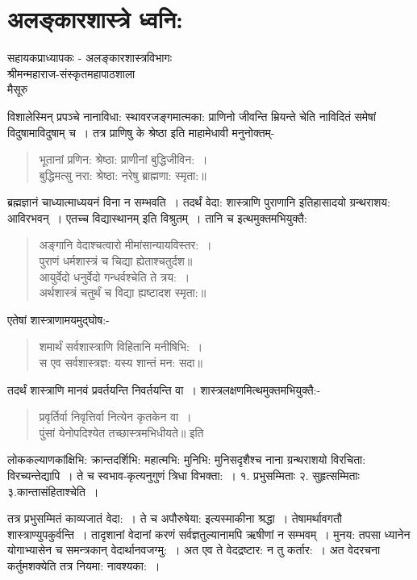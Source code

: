 {\fontsize{15}{17}\selectfont
\presetvalues
\chapter{अलङ्कारशास्त्रे ध्वनि:}

\begin{center}
\smallskip
सहायकप्राध्यापकः - अलङ्कारशास्त्रविभागः\\
श्रीमन्महाराज-संस्कृतमहापाठशाला\\
मैसूरु
\addrule
\end{center}

विशालेस्मिन् प्रपञ्चे नानाविधा: स्थावरजङ्गमात्मका: प्राणिनो जीवन्ति म्रियन्ते चेति नाविदितं समेषां विदुषामाविदुषाम् च~। तत्र प्राणिषु के श्रेष्ठा इति माहामेधावी मनुनोक्तम्-
\begin{verse}
भूतानां प्रणिन: श्रेष्ठा: प्राणीनां बुद्धिजीविन:~। \\
बुद्धिमत्सु नरा: श्रेष्ठा: नरेषु ब्राह्मणा: स्मृता:॥
\end{verse}
ब्रह्मज्ञानं चाध्यात्माध्ययनं विना न सम्भवति~। तदर्थं वेदा: शास्त्राणि पुराणानि इतिहासादयो ग्रन्थराशय: आविरभवन्~। एतच्च विद्यास्थानम् इति विश्रुतम्~। तानि च इत्थमुक्तमभियुक्तै: 
\begin{verse}
अङ्गानि वेदाश्चत्वारो मीमांसान्यायविस्तर:~। \\
पुराणं धर्मशास्त्रं च चिद्या ह्येताश्चतुर्दश॥\\
आयुर्वेदो धनुर्वेदो गन्धर्वश्चेति ते त्रय:~। \\
अर्थशास्त्रं चतुर्थं च विद्या ह्यष्टादश स्मृता:॥
\end{verse}
एतेषां शास्त्राणामयमुद्घोष:-
\begin{verse}
शमार्थं सर्वशास्त्राणि विहितानि मनीषिभि:~। \\
स एव सर्वशास्त्रज्ञ: यस्य शान्तं मन: सदा॥
\end{verse}
तदर्थं शास्त्राणि मानवं प्रवर्तयन्ति निवर्तयन्ति वा~। शास्त्रलक्षणमित्थमुक्तमभियुक्तै:-
\begin{verse}
प्रवृर्तिर्वा निवृत्तिर्वा नित्येन कृतकेन वा~। \\
पुंसां येनोपदिश्येत तच्छास्त्रमभिधीयते॥ इति
\end{verse}
लोककल्याणकांक्षिभि: क्रान्तदर्शिभि: महात्मभि: मुनिभि: मुनिसदृशैश्च नाना ग्रन्थराशयो विरचिता: विरच्यन्तेद्यापि~। ते च स्वभाव-कृत्यनुगुणं त्रिधा विभक्ता:~। १. प्रभुसम्मिताः   २. सुहृत्सम्मिताः  ३.कान्तासंहिताश्चेति~। 

तत्र प्रभुसम्मितं काव्यजातं वेदा:~। ते च अपौरुषेया: इत्यस्माकीना श्रद्धा~। तेषामर्थावगतौ शास्त्राण्युपकुर्वन्ति~। तादृशानां वेदानां करणं सर्वज्ञतुल्यानामपि ऋषीणां न सम्भवम्~। मुनय: तपसा ध्यानेन योगाभ्यासेन च समन्त्रकान् वेदार्थानवजग्मु:~। अत एव ते वेदद्रष्टार: न तु कर्तार:~। अत वेदरचना कर्तुमशक्येति तत्र नियमा: नावश्यका:~। 

}
